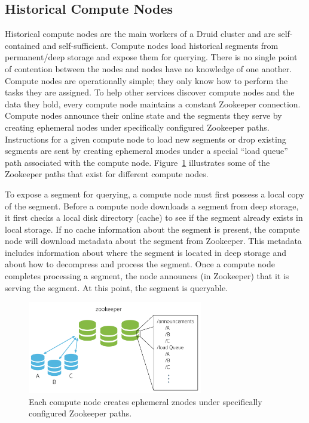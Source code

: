 \documentclass{vldb}
\begin{document}
\subsection{Historical Compute Nodes}
Historical compute nodes are the main workers of a Druid cluster and
are self-contained and self-sufficient. Compute nodes load historical
segments from permanent/deep storage and expose them for
querying. There is no single point of contention between the nodes and
nodes have no knowledge of one another. Compute nodes are
operationally simple; they only know how to perform the tasks they are
assigned. To help other services discover compute nodes and the data
they hold, every compute node maintains a constant Zookeeper
connection. Compute nodes announce their online state and the segments
they serve by creating ephemeral nodes under specifically configured
Zookeeper paths. Instructions for a given compute node to load new
segments or drop existing segments are sent by creating ephemeral
znodes under a special “load queue” path associated with the compute
node. Figure~\ref{fig:zookeeper} illustrates some of the Zookeeper paths that exist
for different compute nodes.

To expose a segment for querying, a compute node must first possess a
local copy of the segment. Before a compute node downloads a segment
from deep storage, it first checks a local disk directory (cache) to
see if the segment already exists in local storage. If no cache
information about the segment is present, the compute node will
download metadata about the segment from Zookeeper. This metadata
includes information about where the segment is located in deep
storage and about how to decompress and process the segment. Once a
compute node completes processing a segment, the node announces (in
Zookeeper) that it is serving the segment. At this point, the segment
is queryable.

\begin{figure}
\centering
\includegraphics[width = 3in]{zookeeper}
\caption{Each compute node creates ephemeral znodes under specifically configured Zookeeper paths.}
\label{fig:zookeeper}
\end{figure}
\end{document}
